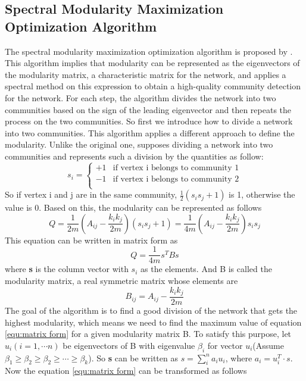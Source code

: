 \documentclass[12pt,oneside,final]{vlsithesis}
\begin{document}
\subsection{Spectral Modularity Maximization Optimization Algorithm}
The spectral modularity maximization optimization algorithm is proposed by \citet{newman2006modularity}. This algorithm implies that modularity can be represented as the eigenvectors of  the modularity matrix, a characteristic matrix for the network, and applies a spectral method on this expression to obtain a high-quality community detection for the network. For each step, the algorithm divides the network into two communities based on the sign of the leading eigenvector and then repeats the process on the two communities. So first we introduce how to divide a network into two communities. This algorithm applies a different approach to define the modularity. Unlike the original one, \citet{newman2006modularity} supposes dividing a network into two communities and represents such a division by the quantities as follow:
\begin{equation}
s_{i} = \begin{cases}
+1 & \mbox{if vertex i belongs to community 1} \\
-1 & \mbox{if vertex i belongs to community 2} \\
\end{cases}
\end{equation}
So if vertex i and j are in the same community, $\frac{1}{2}(s_{i}s_{j} + 1)$ is 1, otherwise the value is 0. Based on this, the modularity can be represented as follows
\begin{equation}
Q  = \frac{1}{2m}(A_{ij} - \frac{k_{i}k_{j}}{2m})(s_{i}s_{j} + 1) = \frac{1}{4m}(A_{ij} - \frac{k_{i}k_{j}}{2m})s_{i}s_{j}
\end{equation}
This equation can be written in matrix form as
\begin{equation}
Q = \frac{1}{4m}s^{T}Bs
\label{equ:matrix form}
\end{equation}
where \textbf{s} is the column vector with $s_{i}$ as the elements. And B is called the modularity matrix, a real symmetric matrix whose elements are
\begin{equation}
	B_{ij} = A_{ij} - \frac{k_{i}k_{j}}{2m}
\label{equ:modularity matrix}
\end{equation}
The goal of the algorithm is to find a good division of the network that gets the highest modularity, which means we need to find the maximum value of equation \ref{equ:matrix form} for a given modularity matrix B. To satisfy this purpose, let $u_{i}(i = 1 , \cdots n)$ be  eigenvectors of B with eigenvalue $\beta_{i}$ for vector $u_{i}$(Assume $\beta_{1} \geq \beta_{2} \geq \beta_{2} \geq \cdots \geq \beta_{k}$). So \textbf{s} can be written as $s = \sum_{i}^{n}a_{i}u_{i}$, where $a_{i} = u_{i}^{T} \cdot s$. Now the equation \ref{equ:matrix form} can be transformed as follows
\end{document}
